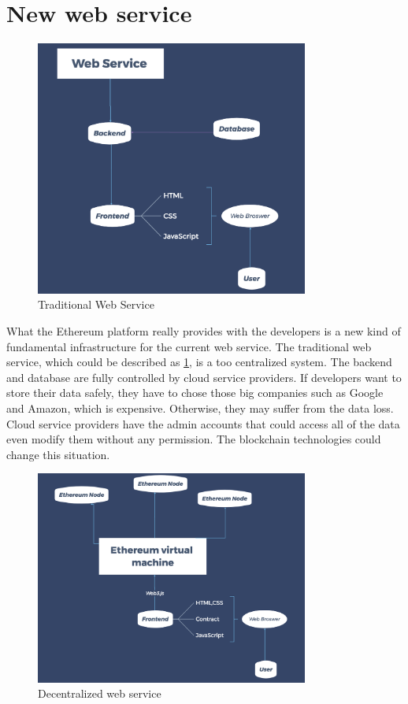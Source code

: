 \documentclass[openany,12pt]{ecsthesis}      %
\begin{document}
\section{New web service}
\begin{figure}[H]
  \centering
  \includegraphics[width=0.8\textwidth]{triditionalWebService.png}
  \caption{Traditional Web Service}
  \label{service} 
\end{figure}
What the Ethereum platform really provides with the developers is a new kind of fundamental infrastructure for the current web service.
The traditional web service, which could be described as \ref{service}, is a too centralized system.
The backend and database are fully controlled by cloud service providers. If developers want to store their data safely, 
they have to chose those big companies such as Google and Amazon, which is expensive. 
Otherwise, they may suffer from the data loss. 
Cloud service providers have the admin accounts that could access all of the data even modify them without any permission.
The blockchain technologies could change this situation.
\begin{figure}[H]
  \centering
  \includegraphics[width=0.8\textwidth]{EthereumWeb.png}
  \caption{Decentralized web service}
  \label{newservice} 
\end{figure}
\end{document}
